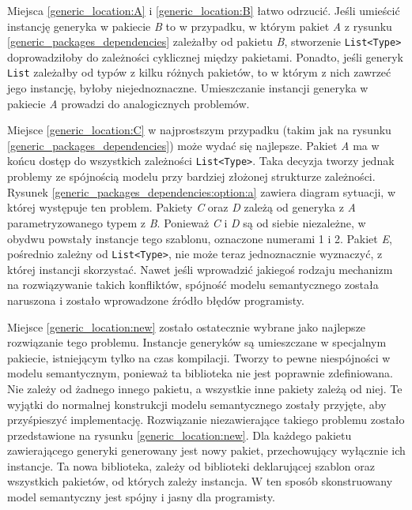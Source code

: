 Miejsca \ref{generic_location:A} i \ref{generic_location:B} łatwo odrzucić.
Jeśli umieścić instancję generyka w pakiecie \emph{B} to w przypadku, w którym pakiet \emph{A} z rysunku \ref{generic_packages_dependencies} zależałby od pakietu \emph{B}, stworzenie \lstinline{List<Type>} doprowadziłoby do zależności cyklicznej między pakietami.
Ponadto, jeśli generyk \lstinline{List} zależałby od typów z kilku różnych pakietów, to w którym z nich zawrzeć jego instancję, byłoby niejednoznaczne.
Umieszczanie instancji generyka w pakiecie \emph{A} prowadzi do analogicznych problemów.

Miejsce \ref{generic_location:C} w najprostszym przypadku (takim jak na rysunku \ref{generic_packages_dependencies}) może wydać się najlepsze.
Pakiet \emph{A} ma w końcu dostęp do wszystkich zależności \lstinline{List<Type>}.
Taka decyzja tworzy jednak problemy ze spójnością modelu przy bardziej złożonej strukturze zależności.
Rysunek \ref{generic_packages_dependencies:option:a} zawiera diagram sytuacji, w której występuje ten problem.
Pakiety \emph{C} oraz \emph{D} zależą od generyka z \emph{A} parametryzowanego typem z \emph{B}.
Ponieważ \emph{C} i \emph{D} są od siebie niezależne, w obydwu powstały instancje tego szablonu, oznaczone numerami 1 i 2.
Pakiet \emph{E}, pośrednio zależny od \lstinline{List<Type>}, nie może teraz jednoznacznie wyznaczyć, z której instancji skorzystać.
Nawet jeśli wprowadzić jakiegoś rodzaju mechanizm na rozwiązywanie takich konfliktów, spójność modelu semantycznego została naruszona i zostało wprowadzone źródło błędów programisty.

Miejsce \ref{generic_location:new} zostało ostatecznie wybrane jako najlepsze rozwiązanie tego problemu.
Instancje generyków są umieszczane w specjalnym pakiecie, istniejącym tylko na czas kompilacji.
Tworzy to pewne niespójności w modelu semantycznym, ponieważ ta biblioteka nie jest poprawnie zdefiniowana.
Nie zależy od żadnego innego pakietu, a wszystkie inne pakiety zależą od niej.
Te wyjątki do normalnej konstrukcji modelu semantycznego zostały przyjęte, aby przyśpieszyć implementację.
Rozwiązanie niezawierające takiego problemu zostało przedstawione na rysunku \ref{generic_location:new}.
Dla każdego pakietu zawierającego generyki generowany jest nowy pakiet, przechowujący wyłącznie ich instancje.
Ta nowa biblioteka, zależy od biblioteki deklarującej szablon oraz wszystkich pakietów, od których zależy instancja.
W ten sposób skonstruowany model semantyczny jest spójny i jasny dla programisty.


